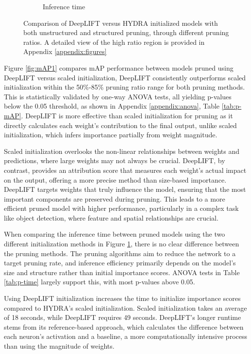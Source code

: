 \documentclass[10pt]{cai}
\begin{document}
\begin{figure}
\begin{subfigure}[b]{.45\textwidth}
      \caption{Inference time}
      \label{fig:time1}
    \end{subfigure}
    \caption{Comparison of DeepLIFT versus HYDRA initialized models with both unstructured and structured pruning, through different pruning ratios. A detailed view of the high ratio region is provided in Appendix \ref{appendix:figures}}
    \label{fig:result1}
\end{figure}

Figure \ref{fig:mAP1} compares mAP performance between models pruned using DeepLIFT versus scaled initialization, DeepLIFT consistently outperforms scaled initialization within the 50\%-85\% pruning ratio range for both pruning methods. This is statistically validated by one-way ANOVA tests, all yielding p-values below the 0.05 threshold, as shown in Appendix \ref{appendix:anova}, Table \ref{tab:p-mAP}. DeepLIFT is more effective than scaled initialization for pruning as it directly calculates each weight's contribution to the final output, unlike scaled initialization, which infers importance partially from weight magnitude.

Scaled initialization overlooks the non-linear relationships between weights and predictions, where large weights may not always be crucial. DeepLIFT, by contrast, provides an attribution score that measures each weight's actual impact on the output, offering a more precise method than size-based importance. DeepLIFT targets weights that truly influence the model, ensuring that the most important components are preserved during pruning. This leads to a more efficient pruned model with higher performance, particularly in a complex task like object detection, where feature and spatial relationships are crucial.

When comparing the inference time between pruned models using the two different initialization methods in Figure \ref{fig:time1}, there is no clear difference between the pruning methods. The pruning algorithms aim to reduce the network to a target pruning rate, and inference efficiency primarily depends on the model’s size and structure rather than initial importance scores. ANOVA tests in Table \ref{tab:p-time} largely support this, with most p-values above 0.05. 

Using DeepLIFT initialization increases the time to initialize importance scores compared to HYDRA's scaled initialization. Scaled initialization takes an average of 18 seconds, while DeepLIFT requires 49 seconds. DeepLIFT's longer runtime stems from its reference-based approach, which calculates the difference between each neuron's activation and a baseline, a more computationally intensive process than using the magnitude of weights.
\end{document}
